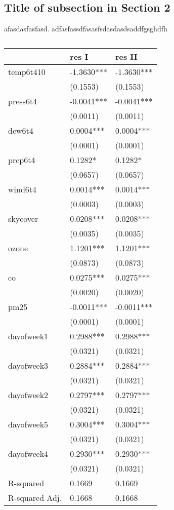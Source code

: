 \documentclass[11pt]{article}
\begin{document}
\subsection{Title of subsection in Section 2}
afasdasfasfasd.
adfasfassdfasasfsdasdasdsaddfgsghdfh
\begin{table}
	\caption{}
	\label{}
	\begin{center}
		\begin{tabular}{lll}
			\hline
			& res I      & res II      \\
			\hline
			temp6t410      & -1.3630*** & -1.3630***  \\
			& (0.1553)   & (0.1553)    \\
			press6t4       & -0.0041*** & -0.0041***  \\
			& (0.0011)   & (0.0011)    \\
			dew6t4         & 0.0004***  & 0.0004***   \\
			& (0.0001)   & (0.0001)    \\
			prcp6t4        & 0.1282*    & 0.1282*     \\
			& (0.0657)   & (0.0657)    \\
			wind6t4        & 0.0014***  & 0.0014***   \\
			& (0.0003)   & (0.0003)    \\
			skycover       & 0.0208***  & 0.0208***   \\
			& (0.0035)   & (0.0035)    \\
			ozone          & 1.1201***  & 1.1201***   \\
			& (0.0873)   & (0.0873)    \\
			co             & 0.0275***  & 0.0275***   \\
			& (0.0020)   & (0.0020)    \\
			pm25           & -0.0011*** & -0.0011***  \\
			& (0.0001)   & (0.0001)    \\
			dayofweek1     & 0.2988***  & 0.2988***   \\
			& (0.0321)   & (0.0321)    \\
			dayofweek3     & 0.2884***  & 0.2884***   \\
			& (0.0321)   & (0.0321)    \\
			dayofweek2     & 0.2797***  & 0.2797***   \\
			& (0.0321)   & (0.0321)    \\
			dayofweek5     & 0.3004***  & 0.3004***   \\
			& (0.0321)   & (0.0321)    \\
			dayofweek4     & 0.2930***  & 0.2930***   \\
			& (0.0321)   & (0.0321)    \\
			R-squared      & 0.1669     & 0.1669      \\
			R-squared Adj. & 0.1668     & 0.1668      \\
			\hline
		\end{tabular}
	\end{center}
\end{table}
\end{document}
